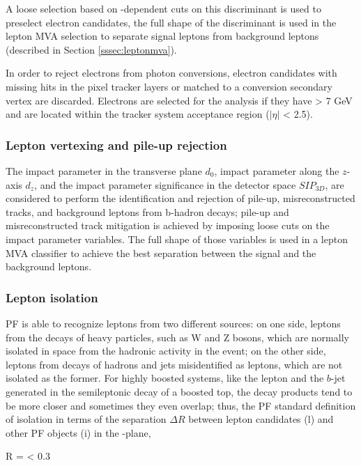 A loose selection based on \etac-dependent cuts on this discriminant is used to preselect electron candidates, the full shape of the discriminant is used in the lepton MVA selection to separate signal leptons from background leptons (described in Section \ref{sssec:leptonmva}).

In order to reject electrons from photon conversions, electron candidates with missing hits in the pixel tracker layers or matched to a conversion secondary vertex are discarded. Electrons are selected for the analysis if they have \pt > 7 GeV and are located within the tracker system acceptance region ($|\eta|$ < 2.5). %

\subsubsection*{Lepton vertexing and pile-up rejection}

The impact parameter in the transverse plane $d_0$, impact parameter along the $z$-axis $d_z$, and the impact parameter significance in the detector space $SIP_{3D}$, are considered to perform the identification and rejection of pile-up, misreconstructed tracks, and background leptons from b-hadron decays; pile-up and misreconstructed track mitigation is achieved by imposing loose cuts on the impact parameter variables. The full shape of those variables is used in a lepton MVA classifier to achieve the best separation between the signal and the background leptons.

\subsubsection*{Lepton isolation}

PF is able to recognize leptons from two different sources: on one side, leptons from the decays of heavy particles, such as W and Z bosons, which are normally isolated in space from the hadronic activity in the event; on the other side, leptons from decays of hadrons and jets misidentified as leptons, which are not isolated as the former. For highly boosted systems, like the lepton and the $b$-jet generated in the semileptonic decay of a boosted top, the decay products tend to be more closer and sometimes they even overlap; thus, the PF standard definition of isolation in terms of the separation $\Delta R$ between lepton candidates (l) and other PF objects (i) in the \etac-\phic plane,

\beqn
\Delta R = < 0.3
\eeqn

